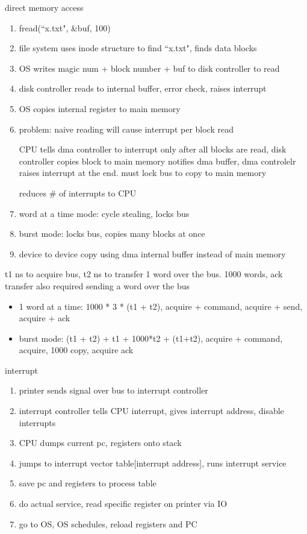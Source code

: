 \documentclass[11pt]{article}
\begin{document}
direct memory access
\begin{enumerate}
    \item fread(``x.txt", \&buf, 100)
    \item file system uses inode structure to find ``x.txt", finds data blocks
    \item OS writes magic num + block number + buf to disk controller to read
    \item disk controller reads to internal buffer, error check, raises interrupt
    \item OS copies internal register to main memory
    \item problem: naive reading will cause interrupt per block read

        CPU tells dma controller to interrupt only after all blocks are read,
        disk controller copies block to main memory notifies dma buffer,
        dma controlelr raises interrupt at the end. must lock bus to copy to main memory

        reduces \# of interrupts to CPU

    \item word at a time mode: cycle stealing, locks bus
    \item burst mode: locks bus, copies many blocks at once
    \item device to device copy using dma internal buffer instead of main memory
\end{enumerate}

t1 ns to acquire bus, t2 ns to transfer 1 word over the bus.
1000 words, ack transfer also required sending a word over the bus
\begin{itemize}
    \item 1 word at a time: 1000 * 3 * (t1 + t2), acquire + command, acquire + send, acquire + ack

    \item burst mode: (t1 + t2) + t1 + 1000*t2 + (t1+t2), acquire + command, acquire, 1000 copy, acquire ack
\end{itemize}

interrupt
\begin{enumerate}
    \item printer sends signal over bus to interrupt controller
    \item interrupt controller tells CPU interrupt, gives interrupt address, disable interrupts
    \item CPU dumps current pc, registers onto stack
    \item jumps to interrupt vector table[interrupt address], runs interrupt service
    \item save pc and registers to process table
    \item do actual service, read specific register on printer via IO
    \item go to OS, OS schedules, reload registers and PC
\end{enumerate}
\end{document}
